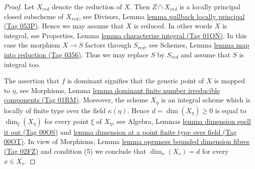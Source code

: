 \documentclass{amsart}
\theoremstyle{plain}
\theoremstyle{definition}
\theoremstyle{remark}
\numberwithin{equation}{subsection}
\begin{document}
\begin{proof}
Let $X_{red}$ denote the reduction of $X$. Then $Z \cap X_{red}$ is
a locally principal closed subscheme of $X_{red}$, see
Divisors, Lemma \href{https://stacks.math.columbia.edu/tag/053P}{lemma pullback locally principal (Tag 053P)}.
Hence we may assume that $X$ is reduced. In other words $X$ is integral, see
Properties, Lemma \href{https://stacks.math.columbia.edu/tag/01ON}{lemma characterize integral (Tag 01ON)}.
In this case the morphism $X \to S$ factors through $S_{red}$, see
Schemes, Lemma \href{https://stacks.math.columbia.edu/tag/0356}{lemma map into reduction (Tag 0356)}.
Thus we may replace $S$ by $S_{red}$ and assume that $S$ is integral too.

\medskip\noindent
The assertion that $f$ is dominant signifies that the generic point of $X$
is mapped to $\eta$, see
Morphisms,
Lemma \href{https://stacks.math.columbia.edu/tag/01RM}{lemma dominant finite number irreducible components (Tag 01RM)}.
Moreover, the scheme $X_\eta$ is an integral scheme which is locally of
finite type over the field $\kappa(\eta)$. Hence
$d = \dim(X_\eta) \geq 0$ is equal to $\dim_\xi(X_\eta)$ for
every point $\xi$ of $X_\eta$, see
Algebra, Lemmas \href{https://stacks.math.columbia.edu/tag/00OS}{lemma dimension spell it out (Tag 00OS)} and
\href{https://stacks.math.columbia.edu/tag/00OT}{lemma dimension at a point finite type over field (Tag 00OT)}.
In view of
Morphisms, Lemma \href{https://stacks.math.columbia.edu/tag/02FZ}{lemma openness bounded dimension fibres (Tag 02FZ)}
and condition (5) we conclude that $\dim_x(X_s) = d$
for every $x \in X_s$.


\end{proof}
\end{document}
